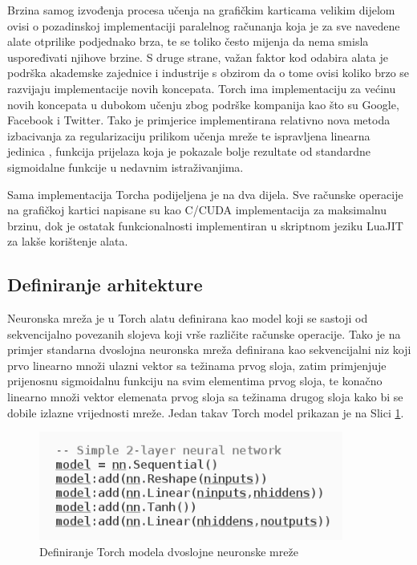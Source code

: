 \documentclass[lmodern, utf8, diplomski, numeric]{fer}
\begin{document}
Brzina samog izvođenja procesa učenja na grafičkim karticama velikim dijelom ovisi o pozadinskoj implementaciji paralelnog računanja koja je za sve navedene alate otprilike podjednako brza, te se toliko često mijenja da nema smisla uspoređivati njihove brzine. S druge strane, važan faktor kod odabira alata je podrška akademske zajednice i industrije s obzirom da o tome ovisi koliko brzo se razvijaju implementacije novih koncepata. Torch ima implementaciju za većinu novih koncepata u dubokom učenju zbog podrške kompanija kao što su Google, Facebook i Twitter.  Tako je primjerice implementirana relativno nova metoda izbacivanja \cite{hinton2014dropout} za regularizaciju prilikom učenja mreže te ispravljena linearna jedinica , funkcija prijelaza koja je pokazale bolje rezultate od standardne sigmoidalne funkcije u nedavnim istraživanjima.

Sama implementacija Torcha podijeljena je na dva dijela. Sve računske operacije na grafičkoj kartici napisane su kao C/CUDA implementacija za maksimalnu brzinu, dok je ostatak funkcionalnosti implementiran u skriptnom jeziku LuaJIT za lakše korištenje alata.  

\subsection{Definiranje arhitekture}
	
Neuronska mreža je u Torch alatu definirana kao model koji se sastoji od sekvencijalno povezanih slojeva koji vrše različite računske operacije.
Tako je na primjer standarna dvoslojna neuronska mreža definirana kao sekvencijalni niz koji prvo linearno množi ulazni vektor sa težinama prvog sloja, zatim primjenjuje prijenosnu sigmoidalnu funkciju na svim elementima prvog sloja, te konačno linearno množi vektor elemenata prvog sloja sa težinama drugog sloja kako bi se dobile izlazne vrijednosti mreže. Jedan takav Torch model prikazan je na Slici \ref{fig:nnmodel}.

\begin{figure}[ht!]
\centering
\includegraphics[width=10cm]{slike/nn_model.png}
\caption{Definiranje Torch modela dvoslojne neuronske mreže}
\label{fig:nnmodel}
\end{figure}
\FloatBarrier
\end{document}
